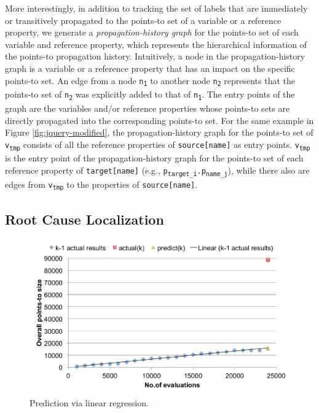 More interestingly, in addition to tracking the set of labels that are immediately or transitively propagated to the points-to set of a variable or a reference property, we generate a {\it propagation-history graph} for the points-to set of each variable and reference property, which represents the hierarchical information of the points-to propagation history. Intuitively, a node in the propagation-history graph is a variable or a reference property that has an impact on the specific points-to set. An edge from a node {\tt n\textsubscript{1}} to another node {\tt n\textsubscript{2}} represents that the points-to set of {\tt n\textsubscript{2}} was explicitly added to that of {\tt n\textsubscript{1}}. The entry points of the graph are the variables and/or reference properties whose points-to sets are directly propagated into the corresponding points-to set. For the same example in Figure \ref{fig:jquery-modified}, the propagation-history graph for the points-to set of {\tt v\textsubscript{tmp}} consists of all the reference properties of {\tt source[name]} as entry points. {\tt v\textsubscript{tmp}} is the entry point of the propagation-history graph for the points-to set of each reference property of {\tt target[name]} (e.g., {\tt p\textsubscript{target\_i}.p\textsubscript{name\_j}}), while there also are edges from {\tt v\textsubscript{tmp}} to the properties of {\tt source[name]}.

\subsection{Root Cause Localization}

\begin{figure}[th!]
        \includegraphics[width=\columnwidth]{linear}
\caption{\textmd{Prediction via linear regression.}}
\label{fig:linear}
\end{figure}

